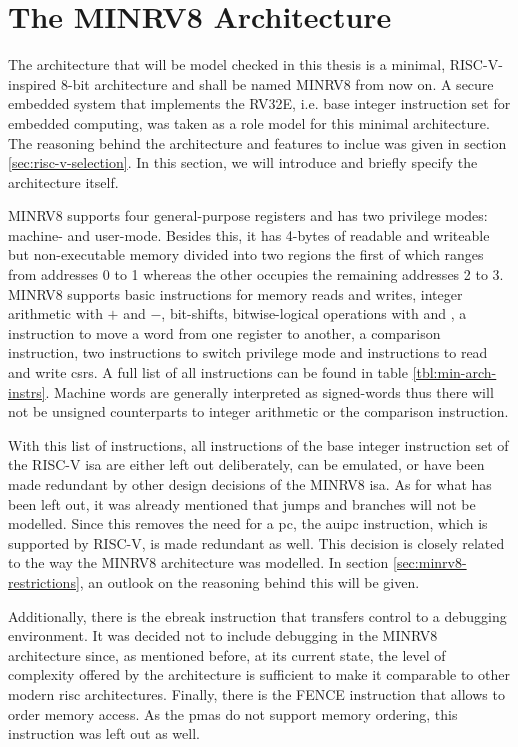 \section{The MINRV8 Architecture}
\label{sec:minrv8}

The architecture that will be model checked in this thesis is a minimal, RISC-V-inspired 8-bit architecture and shall be named MINRV8 from now on.
A secure embedded system that implements the RV32E, i.e. base integer instruction set for embedded computing, was taken as a role model for this minimal architecture.
The reasoning behind the architecture and features to inclue was given in section \ref{sec:risc-v-selection}.
In this section, we will introduce and briefly specify the architecture itself.

MINRV8 supports four general-purpose registers and has two privilege modes: machine- and user-mode.
Besides this, it has 4-bytes of readable and writeable but non-executable memory divided into two regions the first of which ranges from addresses 0 to 1 whereas the other occupies the remaining addresses 2 to 3.
MINRV8 supports basic instructions for memory reads and writes, integer arithmetic with $ + $ and $ - $, bit-shifts, bitwise-logical operations with  and , a  instruction to move a word from one register to another, a comparison instruction, two instructions to switch privilege mode and instructions to read and write \glspl{csr}.
A full list of all instructions can be found in table \ref{tbl:min-arch-instrs}.
Machine words are generally interpreted as signed-words thus there will not be unsigned counterparts to integer arithmetic or the comparison instruction.

With this list of instructions, all instructions of the base integer instruction set of the RISC-V \gls{isa} are either left out deliberately, can be emulated, or have been made redundant by other design decisions of the MINRV8 \gls{isa}.
As for what has been left out, it was already mentioned that jumps and branches will not be modelled.
Since this removes the need for a \gls{pc}, the \gls{auipc} instruction, which is supported by RISC-V, is made redundant as well.
This decision is closely related to the way the MINRV8 architecture was modelled.
In section \ref{sec:minrv8-restrictions}, an outlook on the reasoning behind this will be given.

Additionally, there is the \gls{ebreak} instruction that transfers control to a debugging environment.
It was decided not to include debugging in the MINRV8 architecture since, as mentioned before, at its current state, the level of complexity offered by the architecture is sufficient to make it comparable to other modern \gls{risc} architectures.
Finally, there is the FENCE instruction that allows to order memory access.
As the \glspl{pma} do not support memory ordering, this instruction was left out as well.

